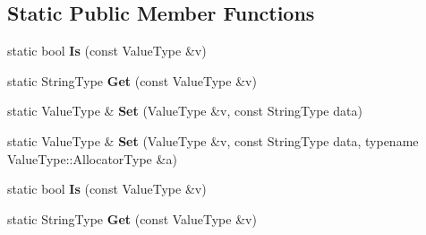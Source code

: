 \subsection*{Static Public Member Functions}
\begin{DoxyCompactItemize}
\item 
static bool {\bfseries Is} (const Value\+Type \&v)\hypertarget{structinternal_1_1_type_helper_3_01_value_type_00_01const_01typename_01_value_type_1_1_ch_01_5_01_4_a9543f180b6ac2b923486f1b69d5356ea}{}\label{structinternal_1_1_type_helper_3_01_value_type_00_01const_01typename_01_value_type_1_1_ch_01_5_01_4_a9543f180b6ac2b923486f1b69d5356ea}

\item 
static String\+Type {\bfseries Get} (const Value\+Type \&v)\hypertarget{structinternal_1_1_type_helper_3_01_value_type_00_01const_01typename_01_value_type_1_1_ch_01_5_01_4_a11f8ddfbc91f1d890d63cc67e3f1abb6}{}\label{structinternal_1_1_type_helper_3_01_value_type_00_01const_01typename_01_value_type_1_1_ch_01_5_01_4_a11f8ddfbc91f1d890d63cc67e3f1abb6}

\item 
static Value\+Type \& {\bfseries Set} (Value\+Type \&v, const String\+Type data)\hypertarget{structinternal_1_1_type_helper_3_01_value_type_00_01const_01typename_01_value_type_1_1_ch_01_5_01_4_af3a44a3b6f485a71a73af69d30668c8f}{}\label{structinternal_1_1_type_helper_3_01_value_type_00_01const_01typename_01_value_type_1_1_ch_01_5_01_4_af3a44a3b6f485a71a73af69d30668c8f}

\item 
static Value\+Type \& {\bfseries Set} (Value\+Type \&v, const String\+Type data, typename Value\+Type\+::\+Allocator\+Type \&a)\hypertarget{structinternal_1_1_type_helper_3_01_value_type_00_01const_01typename_01_value_type_1_1_ch_01_5_01_4_a8588f2ab1d0ffbb4c1810d60a500a8c5}{}\label{structinternal_1_1_type_helper_3_01_value_type_00_01const_01typename_01_value_type_1_1_ch_01_5_01_4_a8588f2ab1d0ffbb4c1810d60a500a8c5}

\item 
static bool {\bfseries Is} (const Value\+Type \&v)\hypertarget{structinternal_1_1_type_helper_3_01_value_type_00_01const_01typename_01_value_type_1_1_ch_01_5_01_4_a9543f180b6ac2b923486f1b69d5356ea}{}\label{structinternal_1_1_type_helper_3_01_value_type_00_01const_01typename_01_value_type_1_1_ch_01_5_01_4_a9543f180b6ac2b923486f1b69d5356ea}

\item 
static String\+Type {\bfseries Get} (const Value\+Type \&v)\hypertarget{structinternal_1_1_type_helper_3_01_value_type_00_01const_01typename_01_value_type_1_1_ch_01_5_01_4_a11f8ddfbc91f1d890d63cc67e3f1abb6}{}\label{structinternal_1_1_type_helper_3_01_value_type_00_01const_01typename_01_value_type_1_1_ch_01_5_01_4_a11f8ddfbc91f1d890d63cc67e3f1abb6}


\end{DoxyCompactItemize}
